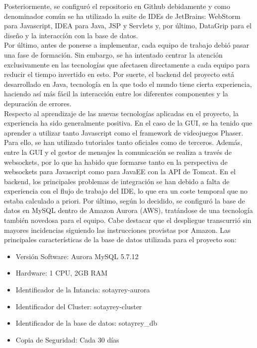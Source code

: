 Posteriormente, se configuró el repositorio en Github debidamente y como denominador común se ha utilizado la suite de IDEs de JetBrains: WebStorm para Javascript, IDEA para Java, JSP y Servlets y, por último, DataGrip para el diseño y la interacción con la base de datos.\\

Por último, antes de ponerse a implementar, cada equipo de trabajo debió pasar una fase de formación. Sin embargo, se ha intentado centrar la atención exclusivamente en las tecnologías que afectasen directamente a cada equipo para reducir el tiempo invertido en esto. Por suerte, el backend del proyecto está desarrollado en Java, tecnología en la que todo el mundo tiene cierta experiencia, haciendo así más fácil la interacción entre los diferentes componentes y la depuración de errores.\\

Respecto al aprendizaje de las nuevas tecnologías aplicadas en el proyecto, la experiencia ha sido generalmente positiva. En el caso de la GUI, se ha tenido que aprender a utilizar tanto Javascript como el framework de videojuegos Phaser. Para ello, se han utilizado tutoriales tanto oficiales como de terceros. Además, entre la GUI y el gestor de mensajes la comunicación se realiza a través de websockets, por lo que ha habido que formarse tanto en la perspectiva de websockets para Javascript como para JavaEE con la API de Tomcat. En el backend, los principales problemas de integración se han debido a falta de experiencia con el flujo de trabajo del IDE, lo que era un coste temporal que no estaba calculado a priori. Por último, según lo decidido, se configuró la base de datos en MySQL dentro de Amazon Aurora (AWS), tratándose de una tecnología también novedosa para el equipo. Cabe destacar que el despliegue transcurrió sin mayores incidencias siguiendo las instrucciones provistas por Amazon. Las principales características de la base de datos utilizada para el proyecto son:

\begin{itemize}
	\item Versión Software: Aurora MySQL 5.7.12
	\item Hardware: 1 CPU, 2GB RAM
	\item Identificador de la Intancia: sotayrey-aurora
	\item Identificador del Cluster: sotayrey-cluster
	\item Identificador de la base de datos: sotayrey\_db
	\item Copia de Seguridad: Cada 30 días
\end{itemize}

